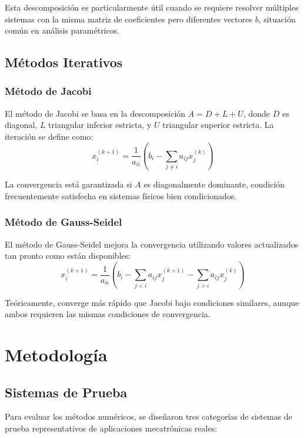 \documentclass[conference]{IEEEtran}
\begin{document}
Esta descomposición es particularmente útil cuando se requiere resolver múltiples sistemas con la misma matriz de coeficientes pero diferentes vectores $b$, situación común en análisis paramétricos.

\subsection{Métodos Iterativos}

\subsubsection{Método de Jacobi}
El método de Jacobi se basa en la descomposición $A = D + L + U$, donde $D$ es diagonal, $L$ triangular inferior estricta, y $U$ triangular superior estricta. La iteración se define como:
\begin{equation}
x^{(k+1)}_i = \frac{1}{a_{ii}}\left(b_i - \sum_{j \neq i} a_{ij} x^{(k)}_j\right)
\end{equation}

La convergencia está garantizada si $A$ es diagonalmente dominante, condición frecuentemente satisfecha en sistemas físicos bien condicionados.

\subsubsection{Método de Gauss-Seidel}
El método de Gauss-Seidel mejora la convergencia utilizando valores actualizados tan pronto como están disponibles:
\begin{equation}
x^{(k+1)}_i = \frac{1}{a_{ii}}\left(b_i - \sum_{j < i} a_{ij} x^{(k+1)}_j - \sum_{j > i} a_{ij} x^{(k)}_j\right)
\end{equation}

Teóricamente, converge más rápido que Jacobi bajo condiciones similares, aunque ambos requieren las mismas condiciones de convergencia.

\section{Metodología}

\subsection{Sistemas de Prueba}

Para evaluar los métodos numéricos, se diseñaron tres categorías de sistemas de prueba representativos de aplicaciones mecatrónicas reales:
\end{document}

